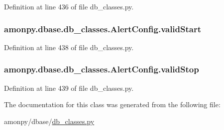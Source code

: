 Definition at line 436 of file db\-\_\-classes.\-py.

\hypertarget{classamonpy_1_1dbase_1_1db__classes_1_1_alert_config_ac4d6388204f392c5838eb2902a5cf263}{
\subsubsection[{valid\-Start}]{\setlength{\rightskip}{0pt plus 5cm}amonpy.\-dbase.\-db\-\_\-classes.\-Alert\-Config.\-valid\-Start}}\label{classamonpy_1_1dbase_1_1db__classes_1_1_alert_config_ac4d6388204f392c5838eb2902a5cf263}


Definition at line 438 of file db\-\_\-classes.\-py.

\hypertarget{classamonpy_1_1dbase_1_1db__classes_1_1_alert_config_af8bb43caa61b4c962ea2e96dc8722461}{
\subsubsection[{valid\-Stop}]{\setlength{\rightskip}{0pt plus 5cm}amonpy.\-dbase.\-db\-\_\-classes.\-Alert\-Config.\-valid\-Stop}}\label{classamonpy_1_1dbase_1_1db__classes_1_1_alert_config_af8bb43caa61b4c962ea2e96dc8722461}


Definition at line 439 of file db\-\_\-classes.\-py.



The documentation for this class was generated from the following file\-:\begin{DoxyCompactItemize}
\item 
amonpy/dbase/\hyperlink{db__classes_8py}{db\-\_\-classes.\-py}\end{DoxyCompactItemize}
